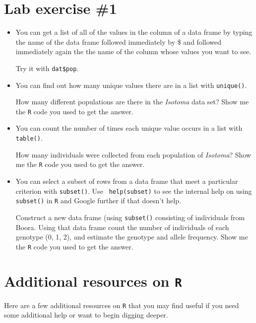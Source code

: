 \documentclass[12pt]{article}
\begin{document}
\section{Lab exercise \#1}

\begin{itemize}

  \item You can get a list of all of the values in the column of a
    data frame by typing the name of the data frame followed
    immediately by \$ and followed immediately again the the name of
    the column whose values you want to see.

    Try it with {\tt dat\$pop}.

  \item You can find out how many unique values there are in a list
    with {\tt unique()}.

    How many different populations are there in the {\it Isotoma}
    data set? Show me the {\tt R} code you used to get the answer.

  \item You can count the number of times each unique value occurs
    in a list with {\tt table()}.

    How many individuals were collected from each population of {\it
      Isotoma}? Show me the {\tt R} code you used to get the answer.

  \item You can select a subset of rows from a data frame that meet
    a particular criterion with {\tt subset()}. Use {\tt
      help(subset)} to see the internal help on using {\tt subset()}
    in {\tt R} and Google further if that doesn't help.
    
    Construct a new data frame (using {\tt subset()} consisting of
    individuals from Boora. Using that data frame count the number of
    individuals of each genotype (0, 1, 2), and estimate the genotype
    and allele frequency. Show me the {\tt R} code you used to get the
    answer.

\end{itemize}

\section{Additional resources on {\tt R}}

Here are a few additional resources on {\tt R} that you may find
useful if you need some additional help or want to begin digging
deeper.
\end{document}
